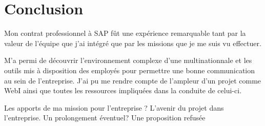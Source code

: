 \chapter*{Conclusion}
Mon contrat professionnel à SAP fût une expérience remarquable tant par la valeur de l'équipe que j'ai intégré que par les missions que je me suis vu effectuer. 

M'a permi de découvrir l'environnement complexe d'une multinationnale et les outils mis à disposition des employés pour permettre une bonne communication au sein de l'entreprise.
J'ai pu me rendre compte de l'ampleur d'un projet comme WebI ainsi que toutes les ressources impliquées dans la conduite de celui-ci.

Les apports de ma mission pour l'entreprise ?
L'avenir du projet dans l'entreprise.
Un prolongement éventuel? Une proposition refusée